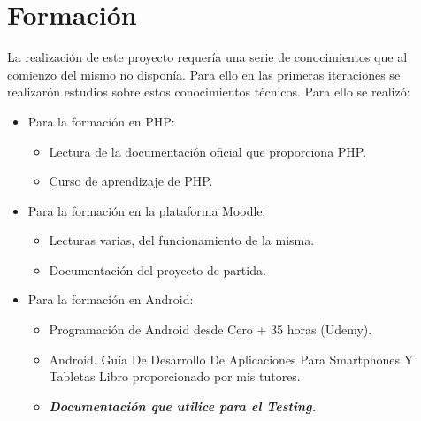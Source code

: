 \section{Formación}

La realización de este proyecto requería una serie de conocimientos que al comienzo del mismo no disponía. Para ello en las primeras iteraciones se realizarón estudios sobre estos conocimientos técnicos. Para ello se realizó:

\begin{itemize}

	\item Para la formación en PHP:
	
	\begin{itemize}
		
		\item Lectura de la documentación oficial que proporciona PHP. \cite{wiki:phpdoc}
		
		\item Curso de aprendizaje de PHP. \cite{wiki:phpcourse}
		
	\end{itemize}
	
	\item Para la formación en la plataforma Moodle:
	
	\begin{itemize}
	
			\item Lecturas varias, del funcionamiento de la misma.
			
			\item Documentación del proyecto de partida.
	
	\end{itemize}
	
	\item Para la formación en Android:
	\begin{itemize}
		
		\item Programación de Android desde Cero + 35 horas (Udemy).
		
		\item Android. Guía De Desarrollo De Aplicaciones Para Smartphones Y Tabletas \cite{wiki:book} Libro proporcionado por mis tutores.
		
		\item \textbf{\textit{Documentación que utilice para el Testing.}}
		
	
	\end{itemize}

\end{itemize}


